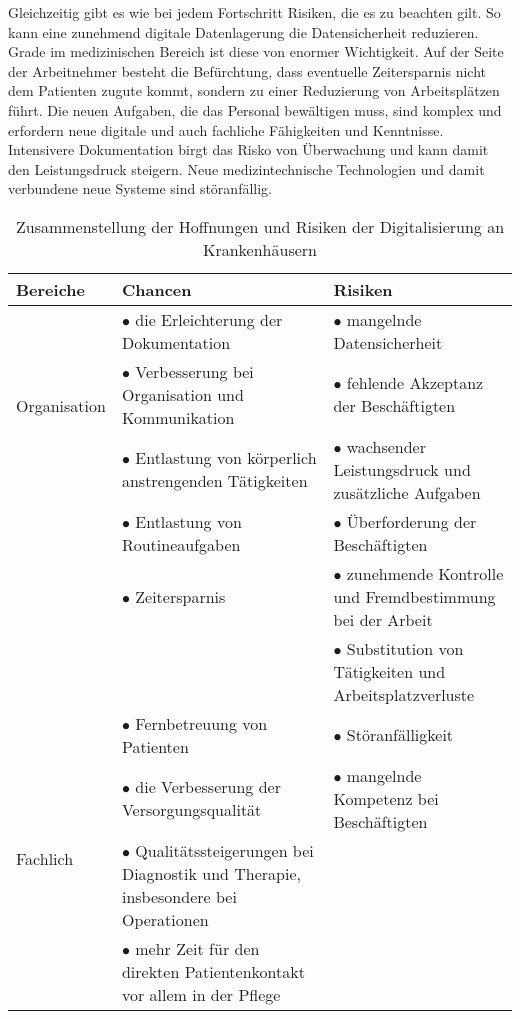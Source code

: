 Gleichzeitig gibt es wie bei jedem Fortschritt Risiken, die es zu beachten gilt. So kann eine zunehmend digitale Datenlagerung die Datensicherheit reduzieren. Grade im medizinischen Bereich ist diese von enormer Wichtigkeit. Auf der Seite der Arbeitnehmer besteht die Befürchtung, dass eventuelle Zeitersparnis nicht dem Patienten zugute kommt, sondern zu einer Reduzierung von Arbeitsplätzen führt. Die neuen Aufgaben, die das Personal bewältigen muss, sind komplex und erfordern neue digitale und auch fachliche Fähigkeiten und Kenntnisse. Intensivere Dokumentation birgt das Risko von Überwachung und kann damit den Leistungsdruck steigern. Neue medizintechnische Technologien und damit verbundene neue Systeme sind störanfällig. \parencite{braeutigam2017}
\begin{table}[ht]
	\begin{tabular}{l|p{}|p{}}
	\textbf{Bereiche}&\textbf{Chancen}&\textbf{Risiken}\\
	\hline
	\multirow{3}{*}{Organisation}
		&$\bullet$ die Erleichterung der Dokumentation &$\bullet$ mangelnde Datensicherheit\\
		&$\bullet$ Verbesserung bei Organisation und Kommunikation &$\bullet$ fehlende Akzeptanz der Beschäftigten\\
	\hline
	\multirow{7}{*}{Personal}
		&$\bullet$ Entlastung von körperlich anstrengenden Tätigkeiten &$\bullet$ wachsender Leistungsdruck und zusätzliche Aufgaben\\
		&$\bullet$ Entlastung von Routineaufgaben &$\bullet$ Überforderung der Beschäftigten\\
		&$\bullet$ Zeitersparnis&$\bullet$ zunehmende Kontrolle und Fremdbestimmung bei der Arbeit\\
		&&$\bullet$ Substitution von Tätigkeiten und Arbeitsplatzverluste\\
	\hline
	\multirow{6}{*}{Fachlich}
		&$\bullet$ Fernbetreuung von Patienten&$\bullet$ Störanfälligkeit\\
		&$\bullet$ die Verbesserung der Versorgungsqualität &$\bullet$ mangelnde Kompetenz bei Beschäftigten\\
		&$\bullet$ Qualitätssteigerungen bei Diagnostik und Therapie, insbesondere bei Operationen&\\
		&$\bullet$ mehr Zeit für den direkten Patientenkontakt vor allem in der Pflege&\\
	\end{tabular}
	\caption{Zusammenstellung der Hoffnungen und Risiken der Digitalisierung an Krankenhäusern \parencite{braeutigam2017}}
	\label{tab:hoffnung_risiken}
\end{table}\\
